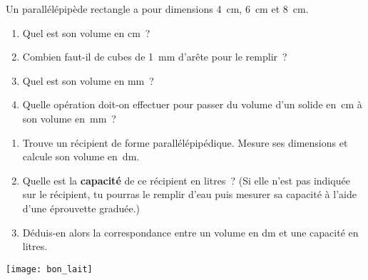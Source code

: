 \begin{activite}[Conversions]

\begin{partie}
Un parallélépipède rectangle a pour dimensions 4 cm, 6 cm et 8 cm.
\begin{enumerate}
 \item Quel est son volume en cm ?
 \item Combien faut-il de cubes de 1 mm d'arête pour le remplir ?
 \item Quel est son volume en mm ?
 \item Quelle opération doit-on effectuer pour passer du volume d'un solide en cm à son volume en mm ?
 \end{enumerate}
\end{partie}

\vspace{2em}

\begin{minipage}[c]{0.8\linewidth}
\begin{partie}
\begin{enumerate}
 \item Trouve un récipient de forme parallélépipédique. Mesure ses dimensions et calcule son volume en dm.
 \item Quelle est la \textbf{capacité} de ce récipient en litres ? (Si elle n'est pas indiquée sur le récipient, tu pourras le remplir d'eau puis mesurer sa capacité à l'aide d'une éprouvette graduée.)
 \item Déduis-en alors la correspondance entre un volume en dm et une capacité en litres.
 \end{enumerate}
\end{partie}
 \end{minipage} \hfill%
\begin{minipage}[c]{0.16\linewidth}
 \texttt{[image: bon\_lait]}
\end{minipage} \\

\end{activite}

